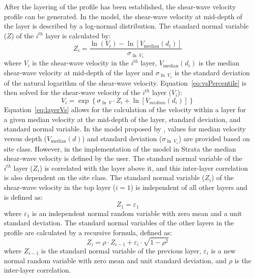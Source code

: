 \documentclass[12pt,oneside]{book}
\begin{document}
After the layering of the profile has been established, the shear-wave velocity profile can be
generated.  In the \citet{toro:95} model, the shear-wave velocity at mid-depth of the layer is
described by a log-normal distribution.  The standard normal variable ($Z$) of the $i^{th}$ layer is
calculated by:
\begin{equation}
    Z_i = \frac{\ln(V_i) - \ln[ V_\text{median}(d_i)]}{\sigma_{\ln\ V_s}}
    \label{eq:vsPercentile}
\end{equation}
where $V_i$ is the shear-wave velocity in the $i^{th}$ layer, $V_\text{median}(d_i)$ is the median
shear-wave velocity at mid-depth of the layer and $\sigma_{\ln\ V_s}$ is the standard deviation of the
natural logarithm of the shear-wave velocity.  Equation~\ref{eq:vsPercentile} is then solved for the
shear-wave velocity of the $i^{th}$ layer ($V_i$):
\begin{equation}
    V_i = \exp \left\{ \sigma_{\ln\ V} \cdot Z_i + \ln \left[ V_{median}(d_i) \right] \right\}
    \label{eq:layerVs}
\end{equation}
Equation~\ref{eq:layerVs} allows for the calculation of the velocity within a layer for a given
median velocity at the mid-depth of the layer, standard deviation, and standard normal variable.  In
the model proposed by \citet{toro:95}, values for median velocity versus depth ($V_\text{median}(d)$) and
standard deviation ($\sigma_{\ln\ V_s}$) are provided based on site class. However, in the
implementation of the \citet{toro:95} model in Strata the median shear-wave velocity is defined by
the user.  The standard normal variable of the $i^{th}$ layer ($Z_i$) is correlated with the layer
above it, and this inter-layer correlation is also dependent on the site class.  The standard normal
variable ($Z_i$) of the shear-wave velocity in the top layer ($i=1$) is independent of all other
layers and is defined as:
\begin{equation}
    Z_1 = \varepsilon_1
\end{equation}
where $\varepsilon_1$ is an independent normal random variable with zero mean and a unit standard
deviation.  The standard normal variables of the other layers in the profile are calculated by a
recursive formula, defined as:
\begin{equation}
    Z_i = \rho \cdot Z_{i-1} + \varepsilon_i \cdot \sqrt{1 - \rho^2} 
\end{equation}
where $Z_{i-1}$ is the standard normal variable of the previous layer, $\varepsilon_i$ is a new
normal random variable with zero mean and unit standard deviation, and $\rho$ is the inter-layer
correlation.  
\end{document}
